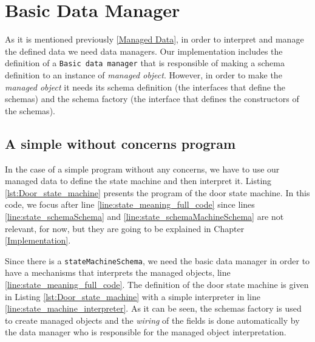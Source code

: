 \section{Basic Data Manager}
As it is mentioned previously \ref{Managed Data}, in order to interpret and manage the defined data we need data managers. 
Our implementation includes the definition of a \texttt{Basic data manager} that is responsible of making a schema definition to an instance of \textit{managed object}.
However, in order to make the \textit{managed object} it needs its schema definition (the interfaces that define the schemas) and the schema factory (the interface that defines the constructors of the schemas).

\subsection{A simple without concerns program}
In the case of a simple program without any concerns, we have to use our managed data to define the state machine and then interpret it.
Listing \ref{lst:Door_state_machine} presents the program of the door state machine.
In this code, we focus after line \ref{line:state_meaning_full_code} since lines \ref{line:state_schemaSchema} and \ref{line:state_schemaMachineSchema} are not relevant, for now, but they are going to be explained in Chapter \ref{Implementation}.

Since there is a \texttt{stateMachineSchema}, we need the basic data manager in order to have a mechanisms that interprets the managed objects, line \ref{line:state_meaning_full_code}.
The definition of the door state machine is given in Listing \ref{lst:Door_state_machine} with a simple interpreter in line \ref{line:state_machine_interpreter}.
As it can be seen, the schemas factory is used to create managed objects and the \textit{wiring} of the fields is done automatically by the data manager who is responsible for the managed object interpretation.

